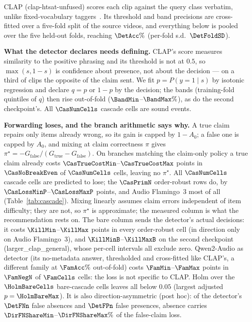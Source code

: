 CLAP (clap-htsat-unfused) scores each clip against the query class verbatim, unlike fixed-vocabulary taggers~\cite{gong2021ast}. Its threshold
and band precisions are cross-fitted over a five-fold split of the source videos, and everything
below is pooled over the five held-out folds, reaching $\DetAcc\%$ (per-fold s.d.\ $\DetFoldSD$).

\noindent\textbf{What the detector declares needs defining.} CLAP's score measures similarity to the positive phrasing and its threshold is not at $0.5$, so
$\max(s,1-s)$ is confidence about presence, not about the decision --- on a third of clips the opposite
of the claim sent. We fit $p=P(y{=}1\mid s)$ by isotonic regression and declare $q=p$ or $1-p$ by the
decision; the bands (training-fold quintiles of $q$) then rise out-of-fold ($\BandMin$--$\BandMax\%$),
as do the second checkpoint's. All $\CasNumCells$ cascade cells are sound events.

\noindent\textbf{Forwarding loses, and the branch arithmetic says why.} A true claim
repairs only items already wrong, so its gain is capped by $1-A_0$; a false one is capped by
$A_0$, and mixing at claim correctness $\pi$ gives
$\pi^{\star}=-G_{\text{false}}/(G_{\text{true}}-G_{\text{false}})$. On branches matching the
claim-only policy a true claim already costs $\CasTrueCostMin$--$\CasTrueCostMax$ points
in $\CasNoBreakEven$ of $\CasNumCells$ cells, leaving no $\pi^{\star}$. All $\CasNumCells$ cascade cells are predicted to lose; the $\CasPrimN$ order-robust rows do, by $\CasLossMinP$--$\CasLossMaxP$ points, and Audio Flamingo~3 most of all (Table~\ref{tab:cascade}).
Mixing linearly assumes claim errors independent of item difficulty; they are not, so $\pi^{\star}$ is
approximate; the measured column is what the recommendation rests on. The bare column sends the detector's actual decisions: it costs $\KillMin$--$\KillMax$ points in
every order-robust cell (in direction only on Audio Flamingo~3), and $\KillMinB$--$\KillMaxB$ on the second
checkpoint (larger\_clap\_general), whose per-cell intervals all exclude zero. Qwen2-Audio as detector (its no-metadata answer, thresholded and cross-fitted like CLAP's, a different family at $\FamAcc\%$ out-of-fold) costs $\FamMin$--$\FamMax$ points in $\FamNegN$ of $\FamCells$
cells: the loss is not specific to CLAP. Holm over the $\HolmBareCells$ bare-cascade cells leaves all below $0.05$
(largest adjusted $p=\HolmBareMax$). It is also direction-asymmetric (post hoc): of the detector's $\DetFNn$ false absences and
$\DetFPn$ false presences, absence carries $\DirFNShareMin$--$\DirFNShareMax\%$ of the false-claim loss.

